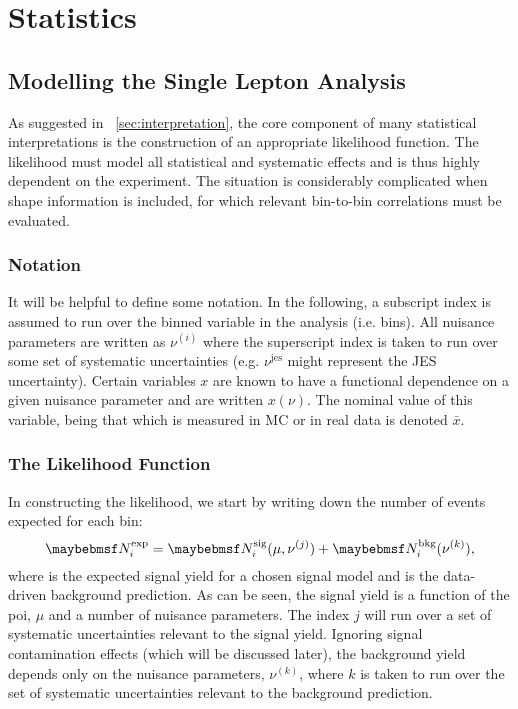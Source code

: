 \chapter{Statistics}
\section{Modelling the Single Lepton Analysis}
\label{sec:inter_1lepton}
As suggested in \chap~\ref{sec:interpretation}, the core component of many
statistical interpretations is the construction of an appropriate likelihood
function. The likelihood must model all statistical and systematic effects and
is thus highly dependent on the experiment. The situation is considerably
complicated when shape information is included, for which relevant bin-to-bin
correlations must be evaluated.

\subsection{Notation}
It will be helpful to define some notation. In the following, a subscript index
is assumed to run over the binned variable in the analysis (i.e. \STlep
bins). All nuisance parameters are written as $\nu^{(i)}$ where the superscript
index is taken to run over some set of systematic uncertainties
(e.g. $\nu^{\textrm{jes}}$ might represent the \ac{JES} uncertainty). Certain
variables $x$ are known to have a functional dependence on a given nuisance
parameter and are written $x(\nu)$. The nominal value of this variable, being
that which is measured in \ac{MC} or in real data is denoted $\bar{x}$.

\subsection{The Likelihood Function}
In constructing the likelihood, we start by writing down the number of events
expected for each bin:
\begin{equation*}
\NExpi = \NSigi(\mu, \nu^{(j)}) +
\NBkgi(\nu^{(k)}),
\end{equation*}
where \NSigi is the expected signal yield for a chosen signal model and \NBkgi
is the data-driven background prediction. As can be seen, the signal yield is a
function of the \ac{poi}, $\mu$ and a number of nuisance parameters. The index
$j$ will run over a set of systematic uncertainties relevant to the signal
yield. Ignoring signal contamination effects (which will be discussed later),
the background yield depends only on the nuisance parameters, $\nu^{(k)}$, where
$k$ is taken to run over the set of systematic uncertainties relevant to the
background prediction.

